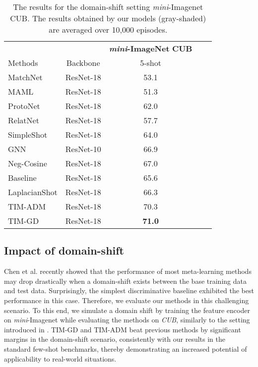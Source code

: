 \documentclass{article}
\begin{document}
        \begin{table}
            \newlength\wexp
            \centering
            \small
            \caption{The results for the domain-shift setting \textit{mini}-Imagenet  CUB. The results obtained by our models (gray-shaded) are averaged over 10,000 episodes.}
            \begin{tabular}{lcccc}
& & \multicolumn{1}{c}{\textbf{\textit{mini}-ImageNet}  \textbf{CUB}}\\
                 Methods & Backbone & 5-shot\\
                 \toprule
                 MatchNet \cite{matching_net} & ResNet-18 & 53.1\\
                 MAML \cite{maml} & ResNet-18 & 51.3 \\
                 ProtoNet \cite{prototypical_nets} & ResNet-18 & 62.0 \\
                 RelatNet \cite{relation_net} & ResNet-18 & 57.7 \\
SimpleShot \cite{simpleshot} & ResNet-18 & 64.0 \\
                GNN \cite{tseng2020cross} & ResNet-10 & 66.9 \\
                Neg-Cosine \cite{liu2020negative} & ResNet-18 & 67.0 \\
                Baseline \cite{closer_look} & ResNet-18 & 65.6 \\
                LaplacianShot \cite{Laplacian} & ResNet-18 & 66.3 \\
                \rowcolor{Gray} TIM-ADM & ResNet-18 & 70.3 \\
                \rowcolor{Gray} TIM-GD & ResNet-18 & \textbf{71.0} \\
                 \bottomrule
            \end{tabular}
            \label{tab:domin_shift_results}
        \end{table}
         
    \subsection{Impact of domain-shift}   
        Chen et al. \cite{closer_look} recently showed that the performance of most meta-learning methods may drop drastically when a domain-shift exists between the base training data and test data. Surprisingly, the simplest 
        discriminative baseline exhibited the best performance in this case. Therefore, we evaluate our methods in this challenging scenario. To this end, we simulate a domain shift by training the feature encoder on \textit{mini}-Imagenet while evaluating the methods on \textit{CUB}, similarly to the setting introduced in \cite{closer_look}. TIM-GD and TIM-ADM beat previous methods by significant margins in the domain-shift scenario, consistently with our results in the standard few-shot benchmarks, thereby demonstrating an increased potential of applicability to real-world situations.
\end{document}
